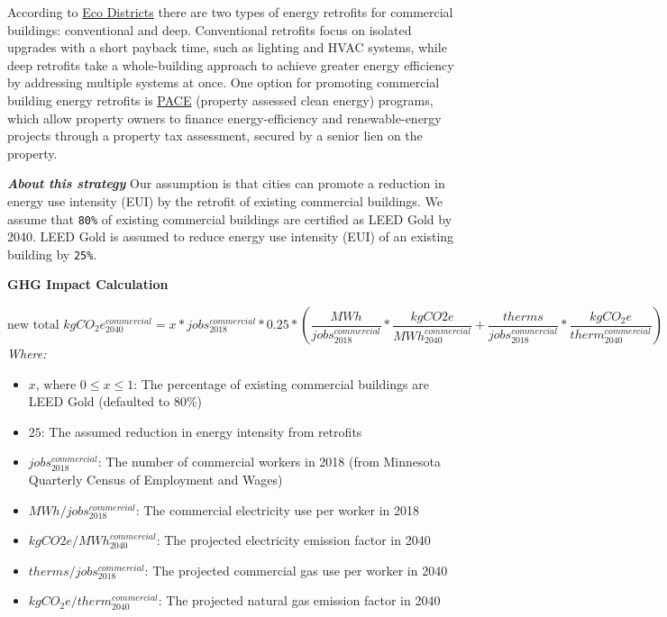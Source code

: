 \documentclass[
]{book}
\begin{document}
According to \href{https://ecodistricts.org/information-exchange/commercial-energy-retrofits/}{Eco Districts} there are two types of energy retrofits for commercial buildings: conventional and deep. Conventional retrofits focus on isolated upgrades with a short payback time, such as lighting and HVAC systems, while deep retrofits take a whole-building approach to achieve greater energy efficiency by addressing multiple systems at once. One option for promoting commercial building energy retrofits is \href{https://minnpace.com/}{PACE} (property assessed clean energy) programs, which allow property owners to finance energy-efficiency and renewable-energy projects through a property tax assessment, secured by a senior lien on the property.

\textbf{\emph{About this strategy}} Our assumption is that cities can promote a reduction in energy use intensity (EUI) by the retrofit of existing commercial buildings. We assume that \texttt{80\%} of existing commercial buildings are certified as LEED Gold by 2040. LEED Gold is assumed to reduce energy use intensity (EUI) of an existing building by \texttt{25\%}.

\textbf{GHG Impact Calculation}

\[\text{new total } kgCO_2e_{2040}^{commercial} = x * jobs_{2018}^{commercial} * 0.25 * \left( \frac{MWh}{jobs_{2018}^{commercial}} * \frac{kgCO2e}{MWh_{2040}^{commercial}} + \frac{therms}{jobs_{2018}^{commercial}} * \frac{kgCO_2e}{therm_{2040}^{commercial}} \right)\]
\emph{Where:}

\begin{itemize}
\item
  \(x\text{, where } 0 \le x \le 1\): The percentage of existing commercial buildings are LEED Gold (defaulted to 80\%)
\item
  \(25%
  \): The assumed reduction in energy intensity from retrofits
\item
  \(jobs_{2018}^{commercial}\): The number of commercial workers in 2018 (from Minnesota Quarterly Census of Employment and Wages)
\item
  \(MWh/jobs_{2018}^{commercial}\): The commercial electricity use per worker in 2018
\item
  \(kgCO2e/MWh_{2040}^{commercial}\): The projected electricity emission factor in 2040
\item
  \(therms/jobs_{2018}^{commercial}\): The projected commercial gas use per worker in 2040
\item
  \(kgCO_2e/therm_{2040}^{commercial}\): The projected natural gas emission factor in 2040
\end{itemize}
\end{document}
